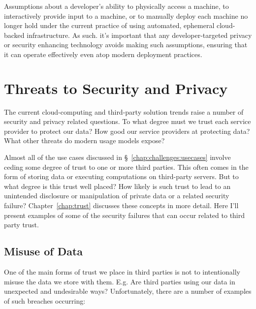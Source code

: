 Assumptions about a developer's ability to physically access a
machine, to interactively provide input to a machine, or to manually
deploy each machine no longer hold under the current practice of using
automated, ephemeral cloud-backed infrastructure. As such. it's
important that any developer-targeted privacy or security enhancing
technology avoids making such assumptions, ensuring that it can
operate effectively even atop modern deployment practices.

\section{Threats to Security and Privacy}
\label{chap:challenges:threats}

The current cloud-computing and third-party solution trends raise a
number of security and privacy related questions. To what degree must
we trust each service provider to protect our data? How good our
service providers at protecting data? What other threats do modern
usage models expose?

Almost all of the use cases discussed in
\S~\ref{chap:challenges:usecases} involve ceding some degree of trust
to one or more third parties. This often comes in the form of storing
data or executing computations on third-party servers. But to what
degree is this trust well placed? How likely is such trust to lead to
an unintended disclosure or manipulation of private data or a related
security failure? Chapter~\ref{chap:trust} discusses these concepts in
more detail. Here I'll present examples of some of the security
failures that can occur related to third party trust.

\subsection{Misuse of Data}

One of the main forms of trust we place in third parties is not to
intentionally misuse the data we store with them. E.g. Are third
parties using our data in unexpected and undesirable ways?
Unfortunately, there are a number of examples of such breaches
occurring:

